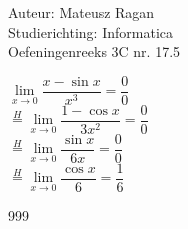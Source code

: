 \documentclass[a4paper]{article}
\begin{document}
\noindent \large Auteur: Mateusz Ragan \\
\noindent \large Studierichting: Informatica\\
\noindent \large Oefeningenreeks 3C nr. 17.5\\

\medskip

\normalsize

$\lim\limits_{x \rightarrow 0} \dfrac{x-\sin x}{x^3} = \dfrac{0}{0}$\\

$\overset{H}{=} \lim\limits_{x \rightarrow 0} \dfrac{1-\cos x}{3x^2} = \dfrac{0}{0}$\\

$\overset{H}{=} \lim\limits_{x \rightarrow 0} \dfrac{\sin x}{6x} = \dfrac{0}{0}$\\

$\overset{H}{=} \lim\limits_{x \rightarrow 0} \dfrac{\cos x}{6} = \dfrac{1}{6}$



\begin{thebibliography}{999}
\end{thebibliography}
\end{document}

